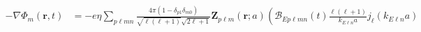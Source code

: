 \documentclass{article}
\begin{document}
\begin{equation}
\begin{split}
-\nabla\Phi_m(\mathbf{r},t) 
&= -e\eta\sum_{p\ell mn}\frac{4\pi(1 - \delta_{p1}\delta_{m0})}{\sqrt{\ell(\ell + 1)}\sqrt{2\ell + 1}}\mathbf{Z}_{p\ell m}(\mathbf{r};a)\left(\mathcal{B}_{Ep\ell mn}(t)\frac{\ell(\ell + 1)}{k_{E\ell n}a}j_\ell(k_{E\ell n}a) \right.\\

\end{split}
\end{equation}
\end{document}
